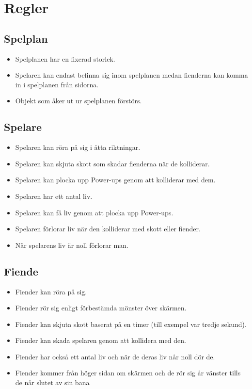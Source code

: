 \documentclass{TDP005mall}
\begin{document}
\section{Regler}
\subsection{Spelplan}
\begin{itemize}
\item Spelplanen har en fixerad storlek.
\item Spelaren kan endast befinna sig inom spelplanen medan fienderna kan komma in i spelplanen från sidorna. 
\item Objekt som åker ut ur spelplanen förstörs.
\end{itemize}

\subsection{Spelare}
\begin{itemize}
\item Spelaren kan röra på sig i åtta riktningar.
\item Spelaren kan skjuta skott som skadar fienderna när de kolliderar.
\item Spelaren kan plocka upp Power-ups genom att kolliderar med dem.
\item Spelaren har ett antal liv.
\item Spelaren kan få liv genom att plocka upp Power-ups.
\item Spelaren förlorar liv när den kolliderar med skott eller fiender.
\item När spelarens liv är noll förlorar man.

\end{itemize}

\subsection{Fiende}
\begin{itemize}
\item Fiender kan röra på sig.
\item Fiender rör sig enligt förbestämda mönster över skärmen.
\item Fiender kan skjuta skott baserat på en timer (till exempel var tredje sekund).
\item Fiender kan skada spelaren genom att kollidera med den.
\item Fiender har också ett antal liv och när de deras liv når noll dör de.
\item Fiender kommer från höger sidan om skärmen och de rör sig år vänster tills de når slutet av sin bana  
\end{itemize}
\end{document}
